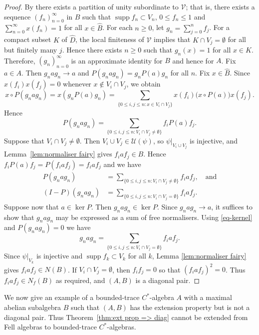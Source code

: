 \documentclass[12pt,a4paper]{amsart}
\newcommand{\Uu}{\mathcal{U}}
\newcommand{\Vv}{\mathcal{V}}
\newcommand{\supp}{\operatorname{supp}}
\begin{document}
\begin{proof}
By \cite[Lemma 4.34]{tfb} there exists a partition of unity
subordinate to $\Vv$; that is, there exists a sequence
$(f_n)^\infty_{n=0}$ in $B$ such that $\supp f_n \subset V_n$,
$0 \le f_n \le 1$ and $\sum_{n=0}^\infty x(f_n) = 1$ for all $x
\in \widehat{B}$. For each $n \ge 0$, let $g_n = \sum_{j=0}^n
f_j$. For a compact subset $K$ of $\widehat{D}$, the local
finiteness of $\Vv$ implies that $K \cap V_j = \emptyset$ for
all but finitely many $j$. Hence there exists $n \ge 0$ such
that $g_n(x) = 1$ for all $x \in K$. Therefore,
$(g_n)^\infty_{n=0}$ is an approximate identity for $B$ and
hence for $A$. Fix $a \in A$. Then $g_n a g_n \to a$ and
$P(g_nag_n) = g_nP(a)g_n$ for all $n$. Fix $x \in \widehat{B}$.
Since $x(f_i)x(f_j) = 0$ whenever $x \not\in V_i \cap V_j$, we
obtain
\[
x \circ P(g_nag_n) = x (g_nP(a)g_n) =
           \sum_{\{0\leq i,j\leq n:x \in V_i \cap V_j\}} x(f_i) \big(x \circ P(a)\big) x(f_j).
\]
Hence
\[
P(g_nag_n) =
           \sum_{\{0\leq i,j\leq n: V_i \cap V_j\neq\emptyset\}} f_i P(a) f_j.
\]
Suppose that $V_i \cap V_j \ne \emptyset$. Then $V_i \cup V_j
\in \Uu(\psi)$, so $\psi|_{V_i\cup V_j}$ is injective, and
Lemma~\ref{lem:normaliser fairy} gives $f_i a  f_j  \in B$.
Hence  $f_i P(a) f_j = P(f_i a f_j) = f_i a  f_j$ and we have
\begin{equation}\begin{split}\label{eq-kernel}
P(g_nag_n) &= \sum_{\{0\leq i,j\leq n: V_i \cap V_j\neq\emptyset\}} f_i  a f_j, \quad \text{and} \\
(I - P)(g_nag_n) & = \sum_{\{0\leq i,j\leq n: V_i \cap V_j=\emptyset\}} f_i  a f_j.
\end{split}
\end{equation}
Suppose now that $a \in \ker P$. Then $g_nag_n \in \ker P$.
Since $g_nag_n \to a$, it suffices to show that $g_nag_n$ may
be expressed as a sum of free normalisers. Using
\eqref{eq-kernel} and $P(g_nag_n) = 0$ we have
\[
g_nag_n = \sum_{\{0\leq i,j\leq n: V_i \cap V_j=\emptyset\}}f_i  a f_j.
\]
Since $\psi|_{V_k}$ is injective and $\supp f_k \subset V_k$  for
all $k$, Lemma \ref{lem:normaliser fairy} gives $f_i  a f_j \in N(B)$.
If $V_i \cap V_j = \emptyset$, then $f_i  f_j = 0$ so that
$(f_iaf_j)^2=0$. Thus $f_i  a f_j \in N_f(B)$ as required, and
$(A,B)$ is a diagonal pair.
\end{proof}

We now give an example of a bounded-trace $C^*$-algebra $A$ with
a maximal abelian subalgebra $B$ such that $(A,B)$ has the
extension property but is not a diagonal pair. Thus
Theorem~\ref{thm:ext prop => diag} cannot be extended from Fell
algebras to bounded-trace $C^*$-algebras.
\end{document}
